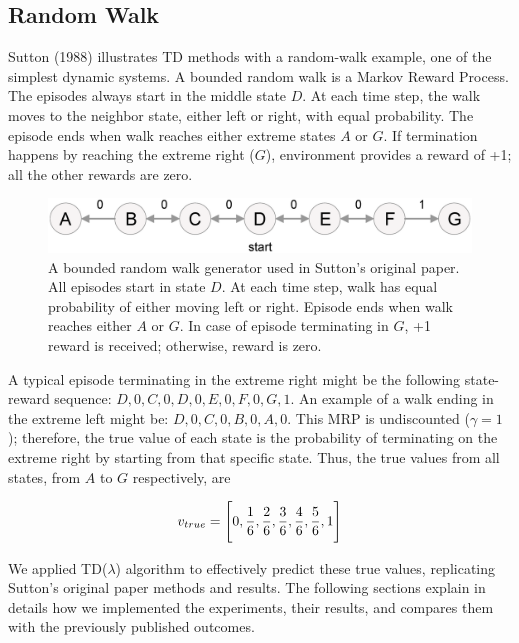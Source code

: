 \documentclass{article}
\begin{document}
\subsection{Random Walk}
\label{subsec:randomwalk}
Sutton (1988) illustrates TD methods with a random-walk example, one of the simplest dynamic systems.
A bounded random walk is a Markov Reward Process.
The episodes always start in the middle state $D$.
At each time step, the walk moves to the neighbor state, either left or right, with equal probability.
The episode ends when walk reaches either extreme states $A$ or $G$.
If termination happens by reaching the extreme right ($G$), environment provides a reward of +1;
all the other rewards are zero.

\begin{figure}[t]
    \includegraphics[scale=0.3]{./images/random_walk.eps}
    \centering
    \caption{A bounded random walk generator used in Sutton's original paper.
    All episodes start in state $D$.
    At each time step, walk has equal probability of either moving left or right.
    Episode ends when walk reaches either $A$ or $G$.
    In case of episode terminating in $G$, +1 reward is received;
    otherwise, reward is zero.}
    \label{fig:1}
\end{figure}

A typical episode terminating in the extreme right might be the following state-reward sequence: $D, 0, C, 0, D, 0, E, 0, F, 0, G, 1$.
An example of a walk ending in the extreme left might be: $D, 0, C, 0, B, 0, A, 0$.
This MRP is undiscounted ($\gamma = 1$);
therefore, the true value of each state is the probability of terminating on the extreme right by starting from that specific state.
Thus, the true values from all states, from $A$ to $G$ respectively, are

\begin{equation}
    v_{true} = \Bigg[0, \frac{1}{6}, \frac{2}{6}, \frac{3}{6}, \frac{4}{6}, \frac{5}{6}, 1\Bigg]
    \centering
\end{equation}

We applied TD($\lambda$) algorithm to effectively predict these true values, replicating Sutton's original paper methods and results.
The following sections explain in details how we implemented the experiments, their results, and compares them with the previously published outcomes.
\end{document}
